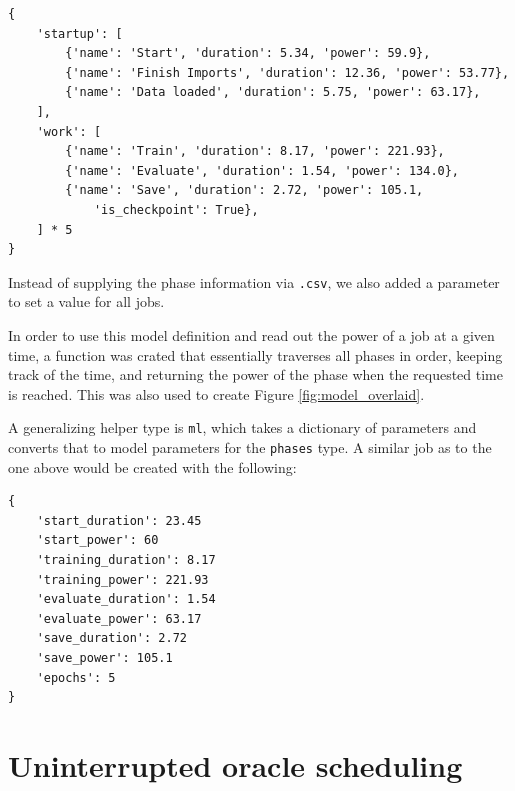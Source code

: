 \begin{minipage}{\linewidth}
\begin{lstlisting}[frame=single, numbers=none, caption={Simplified definition for a job similar to the experiment}, label={list:roberta_model_definition}, basicstyle=\ttfamily]
{
    'startup': [
        {'name': 'Start', 'duration': 5.34, 'power': 59.9},
        {'name': 'Finish Imports', 'duration': 12.36, 'power': 53.77},
        {'name': 'Data loaded', 'duration': 5.75, 'power': 63.17}, 
    ],
    'work': [
        {'name': 'Train', 'duration': 8.17, 'power': 221.93}, 
        {'name': 'Evaluate', 'duration': 1.54, 'power': 134.0}, 
        {'name': 'Save', 'duration': 2.72, 'power': 105.1,
            'is_checkpoint': True}, 
    ] * 5
}
\end{lstlisting}
\end{minipage}

Instead of supplying the phase information via \verb|.csv|, we also added a parameter to set a value for all jobs.

In order to use this model definition and read out the power of a job at a given time, a function was crated that essentially traverses all phases in order, keeping track of the time, and returning the power of the phase when the requested time is reached. 
This was also used to create Figure \ref{fig:model_overlaid}.

A generalizing helper type is \verb|ml|, which takes a dictionary of parameters and converts that to model parameters for the \verb|phases| type. A similar job as to the one above would be created with the following:

\begin{minipage}{\linewidth}
\begin{lstlisting}[frame=single, numbers=none, caption={Generic model definition for machine learning jobs}, label={list:roberta_model_definition_generic}, basicstyle=\ttfamily]
{
    'start_duration': 23.45
    'start_power': 60
    'training_duration': 8.17
    'training_power': 221.93
    'evaluate_duration': 1.54
    'evaluate_power': 63.17
    'save_duration': 2.72
    'save_power': 105.1
    'epochs': 5
}
\end{lstlisting}
\end{minipage}

\section{Uninterrupted oracle scheduling} \label{sec:uninterrupted_oracle_scheduling}

